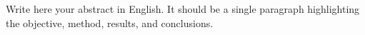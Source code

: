 Write here your abstract in English. It should be a single paragraph highlighting the objective, method, results, and conclusions.